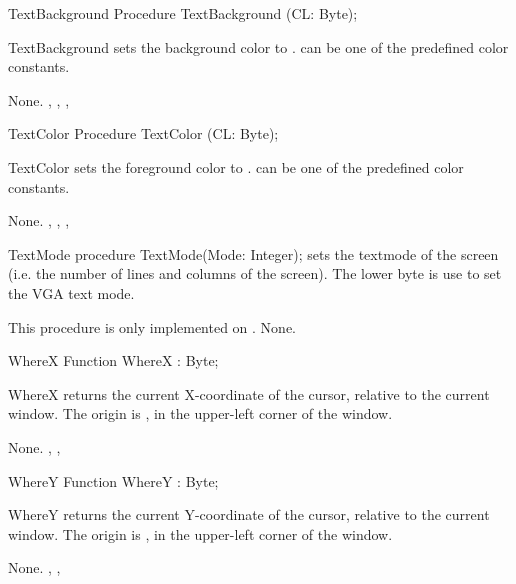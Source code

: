 \begin{procedure}{TextBackground}
\Declaration
Procedure TextBackground (CL: Byte);
\Description

TextBackground sets the background color to .  can be one of the
predefined color constants.

\Errors
None.
\SeeAlso
 , , ,
\end{procedure}

 
\begin{procedure}{TextColor}
\Declaration
Procedure TextColor (CL: Byte);
\Description

TextColor sets the foreground color to .  can be one of the
predefined color constants.

\Errors
None.
\SeeAlso
 , , ,
\end{procedure}


\begin{procedure}{TextMode}
\Declaration
procedure TextMode(Mode: Integer);
\Description
{} sets the textmode of the screen (i.e. the number of lines
and columns of the screen). The lower byte is use to set the VGA text mode.

This procedure is only implemented on \dos.
\Errors
None.
\SeeAlso
{}
\end{procedure}
 
\begin{function}{WhereX}
\Declaration
Function WhereX  : Byte;
\Description

WhereX returns the current X-coordinate of the cursor, relative to the
current window. The origin is , in the upper-left corner of the
window.

\Errors
None.
\SeeAlso
 , ,  
\end{function}

 
\begin{function}{WhereY}
\Declaration
Function WhereY  : Byte;
\Description

WhereY returns the current Y-coordinate of the cursor, relative to the
current window. The origin is , in the upper-left corner of the
window.

\Errors
None.
\SeeAlso
 , ,  
\end{function}

